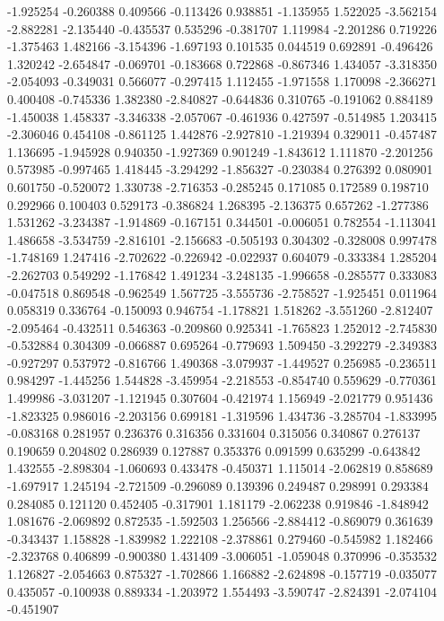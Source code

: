 -1.925254
-0.260388
0.409566
-0.113426
0.938851
-1.135955
1.522025
-3.562154
-2.882281
-2.135440
-0.435537
0.535296
-0.381707
1.119984
-2.201286
0.719226
-1.375463
1.482166
-3.154396
-1.697193
0.101535
0.044519
0.692891
-0.496426
1.320242
-2.654847
-0.069701
-0.183668
0.722868
-0.867346
1.434057
-3.318350
-2.054093
-0.349031
0.566077
-0.297415
1.112455
-1.971558
1.170098
-2.366271
0.400408
-0.745336
1.382380
-2.840827
-0.644836
0.310765
-0.191062
0.884189
-1.450038
1.458337
-3.346338
-2.057067
-0.461936
0.427597
-0.514985
1.203415
-2.306046
0.454108
-0.861125
1.442876
-2.927810
-1.219394
0.329011
-0.457487
1.136695
-1.945928
0.940350
-1.927369
0.901249
-1.843612
1.111870
-2.201256
0.573985
-0.997465
1.418445
-3.294292
-1.856327
-0.230384
0.276392
0.080901
0.601750
-0.520072
1.330738
-2.716353
-0.285245
0.171085
0.172589
0.198710
0.292966
0.100403
0.529173
-0.386824
1.268395
-2.136375
0.657262
-1.277386
1.531262
-3.234387
-1.914869
-0.167151
0.344501
-0.006051
0.782554
-1.113041
1.486658
-3.534759
-2.816101
-2.156683
-0.505193
0.304302
-0.328008
0.997478
-1.748169
1.247416
-2.702622
-0.226942
-0.022937
0.604079
-0.333384
1.285204
-2.262703
0.549292
-1.176842
1.491234
-3.248135
-1.996658
-0.285577
0.333083
-0.047518
0.869548
-0.962549
1.567725
-3.555736
-2.758527
-1.925451
0.011964
0.058319
0.336764
-0.150093
0.946754
-1.178821
1.518262
-3.551260
-2.812407
-2.095464
-0.432511
0.546363
-0.209860
0.925341
-1.765823
1.252012
-2.745830
-0.532884
0.304309
-0.066887
0.695264
-0.779693
1.509450
-3.292279
-2.349383
-0.927297
0.537972
-0.816766
1.490368
-3.079937
-1.449527
0.256985
-0.236511
0.984297
-1.445256
1.544828
-3.459954
-2.218553
-0.854740
0.559629
-0.770361
1.499986
-3.031207
-1.121945
0.307604
-0.421974
1.156949
-2.021779
0.951436
-1.823325
0.986016
-2.203156
0.699181
-1.319596
1.434736
-3.285704
-1.833995
-0.083168
0.281957
0.236376
0.316356
0.331604
0.315056
0.340867
0.276137
0.190659
0.204802
0.286939
0.127887
0.353376
0.091599
0.635299
-0.643842
1.432555
-2.898304
-1.060693
0.433478
-0.450371
1.115014
-2.062819
0.858689
-1.697917
1.245194
-2.721509
-0.296089
0.139396
0.249487
0.298991
0.293384
0.284085
0.121120
0.452405
-0.317901
1.181179
-2.062238
0.919846
-1.848942
1.081676
-2.069892
0.872535
-1.592503
1.256566
-2.884412
-0.869079
0.361639
-0.343437
1.158828
-1.839982
1.222108
-2.378861
0.279460
-0.545982
1.182466
-2.323768
0.406899
-0.900380
1.431409
-3.006051
-1.059048
0.370996
-0.353532
1.126827
-2.054663
0.875327
-1.702866
1.166882
-2.624898
-0.157719
-0.035077
0.435057
-0.100938
0.889334
-1.203972
1.554493
-3.590747
-2.824391
-2.074104
-0.451907
